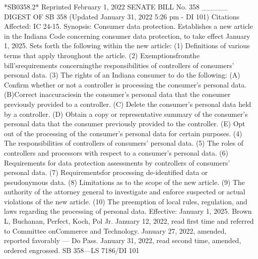 *SB0358.2*
Reprinted
February 1, 2022
SENATE BILL No. 358
_____
DIGEST OF SB 358 (Updated January 31, 2022 5:26 pm - DI 101)
Citations Affected: IC 24-15.
Synopsis: Consumer data protection. Establishes a new article in the
Indiana Code concerning consumer data protection, to take effect
January 1, 2025. Sets forth the following within the new article: (1)
Definitions of various terms that apply throughout the article. (2)
Exemptionsfromthe bill'srequirements concerningthe responsibilities
of controllers of consumers' personal data. (3) The rights of an Indiana
consumer to do the following: (A) Confirm whether or not a controller
is processing the consumer's personal data.(B)Correct inaccuraciesin
the consumer's personal data that the consumer previously provided to
a controller. (C) Delete the consumer's personal data held by a
controller. (D) Obtain a copy or representative summary of the
consumer's personal data that the consumer previously provided to the
controller. (E) Opt out of the processing of the consumer's personal
data for certain purposes. (4) The responsibilities of controllers of
consumers' personal data. (5) The roles of controllers and processors
with respect to a consumer's personal data. (6) Requirements for data
protection assessments by controllers of consumers' personal data. (7)
Requirementsfor processing de-identified data or pseudonymous data.
(8) Limitations as to the scope of the new article. (9) The authority of
the attorney general to investigate and enforce suspected or actual
violations of the new article. (10) The preemption of local rules,
regulation, and laws regarding the processing of personal data.
Effective: January 1, 2025.
Brown L, Buchanan, Perfect, Koch,
Pol Jr.
January 12, 2022, read first time and referred to Committee onCommerce and Technology.
January 27, 2022, amended, reported favorably — Do Pass.
January 31, 2022, read second time, amended, ordered engrossed.
SB 358—LS 7186/DI 101

